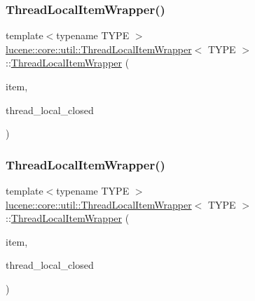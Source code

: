 \subsubsection{\texorpdfstring{Thread\+Local\+Item\+Wrapper()}{ThreadLocalItemWrapper()}\hspace{0.1cm}{\footnotesize\ttfamily [2/3]}}
{\footnotesize\ttfamily template$<$typename T\+Y\+PE $>$ \\
\mbox{\hyperlink{classlucene_1_1core_1_1util_1_1ThreadLocalItemWrapper}{lucene\+::core\+::util\+::\+Thread\+Local\+Item\+Wrapper}}$<$ T\+Y\+PE $>$\+::\mbox{\hyperlink{classlucene_1_1core_1_1util_1_1ThreadLocalItemWrapper}{Thread\+Local\+Item\+Wrapper}} (\begin{DoxyParamCaption}\item[{\mbox{\hyperlink{ZlibCrc32_8h_a2c212835823e3c54a8ab6d95c652660e}{const}} T\+Y\+PE \&}]{item,  }\item[{bool $\ast$}]{thread\+\_\+local\+\_\+closed }\end{DoxyParamCaption})\hspace{0.3cm}{\ttfamily [inline]}}

\mbox{\label{classlucene_1_1core_1_1util_1_1ThreadLocalItemWrapper_af5f7a927aa01a94971cb9a358488d551}} 
\subsubsection{\texorpdfstring{Thread\+Local\+Item\+Wrapper()}{ThreadLocalItemWrapper()}\hspace{0.1cm}{\footnotesize\ttfamily [3/3]}}
{\footnotesize\ttfamily template$<$typename T\+Y\+PE $>$ \\
\mbox{\hyperlink{classlucene_1_1core_1_1util_1_1ThreadLocalItemWrapper}{lucene\+::core\+::util\+::\+Thread\+Local\+Item\+Wrapper}}$<$ T\+Y\+PE $>$\+::\mbox{\hyperlink{classlucene_1_1core_1_1util_1_1ThreadLocalItemWrapper}{Thread\+Local\+Item\+Wrapper}} (\begin{DoxyParamCaption}\item[{T\+Y\+PE \&\&}]{item,  }\item[{bool $\ast$}]{thread\+\_\+local\+\_\+closed }\end{DoxyParamCaption})\hspace{0.3cm}{\ttfamily [inline]}}



